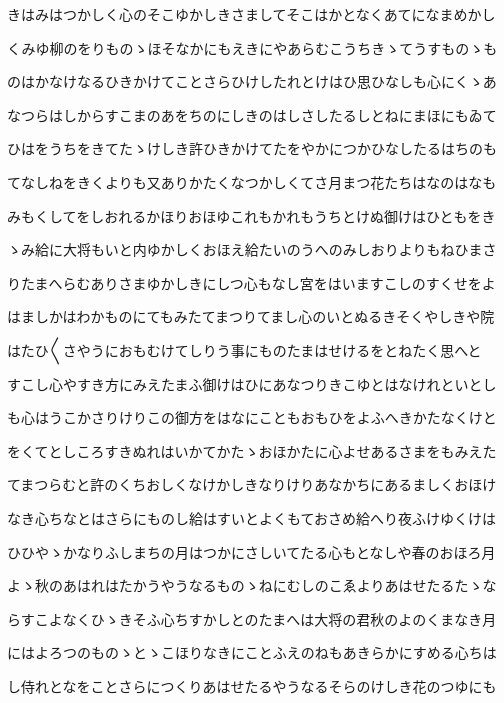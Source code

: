 \documentclass[a4paper,11pt,landscape]{ltjtarticle}
\begin{document}
\par\medskip
きはみはつかしく心のそこゆかしきさましてそこはかとなくあてになまめかし
\par\medskip
くみゆ柳のをりものゝほそなかにもえきにやあらむこうちきゝてうすものゝも
\par\medskip
のはかなけなるひきかけてことさらひけしたれとけはひ思ひなしも心にくゝあ
\par\medskip
なつらはしからすこまのあをちのにしきのはしさしたるしとねにまほにもゐて
\par\medskip
ひはをうちをきてたゝけしき許ひきかけてたをやかにつかひなしたるはちのも
\par\medskip
てなしねをきくよりも又ありかたくなつかしくてさ月まつ花たちはなのはなも
\par\medskip
みもくしてをしおれるかほりおほゆこれもかれもうちとけぬ御けはひともをき
\par\medskip
ゝみ給に大将もいと内ゆかしくおほえ給たいのうへのみしおりよりもねひまさ
\par\medskip
りたまへらむありさまゆかしきにしつ心もなし宮をはいますこしのすくせをよ
\par\medskip
はましかはわかものにてもみたてまつりてまし心のいとぬるきそくやしきや院
\par\medskip
はたひ〱さやうにおもむけてしりう事にものたまはせけるをとねたく思へと
\par\medskip
すこし心やすき方にみえたまふ御けはひにあなつりきこゆとはなけれといとし
\par\medskip
も心はうこかさりけりこの御方をはなにこともおもひをよふへきかたなくけと
\par\medskip
をくてとしころすきぬれはいかてかたゝおほかたに心よせあるさまをもみえた
\par\medskip
てまつらむと許のくちおしくなけかしきなりけりあなかちにあるましくおほけ
\par\medskip
なき心ちなとはさらにものし給はすいとよくもておさめ給へり夜ふけゆくけは
\par\medskip
ひひやゝかなりふしまちの月はつかにさしいてたる心もとなしや春のおほろ月
\par\medskip
よゝ秋のあはれはたかうやうなるものゝねにむしのこゑよりあはせたるたゝな
\par\medskip
らすこよなくひゝきそふ心ちすかしとのたまへは大将の君秋のよのくまなき月
\par\medskip
にはよろつのものゝとゝこほりなきにことふえのねもあきらかにすめる心ちは
\par\medskip
し侍れとなをことさらにつくりあはせたるやうなるそらのけしき花のつゆにも
\end{document}
